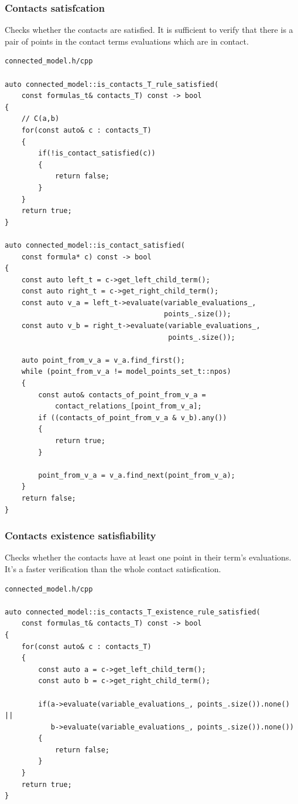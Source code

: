 \documentclass{article}
\begin{document}
	\subsubsection*{Contacts satisfcation}
	Checks whether the contacts are satisfied. It is sufficient to verify that there is a pair of points in the contact terms evaluations which are in contact.
\\
\begin{lstlisting}
connected_model.h/cpp

auto connected_model::is_contacts_T_rule_satisfied(
	const formulas_t& contacts_T) const -> bool
{
    // C(a,b)
    for(const auto& c : contacts_T)
    {
        if(!is_contact_satisfied(c))
        {
            return false;
        }
    }
    return true;
}

auto connected_model::is_contact_satisfied(
	const formula* c) const -> bool
{
    const auto left_t = c->get_left_child_term();
    const auto right_t = c->get_right_child_term();
    const auto v_a = left_t->evaluate(variable_evaluations_,
                                      points_.size());
    const auto v_b = right_t->evaluate(variable_evaluations_,
                                       points_.size());

    auto point_from_v_a = v_a.find_first();
    while (point_from_v_a != model_points_set_t::npos)
    {
        const auto& contacts_of_point_from_v_a =
            contact_relations_[point_from_v_a];
        if ((contacts_of_point_from_v_a & v_b).any())
        {
            return true;
        }

        point_from_v_a = v_a.find_next(point_from_v_a);
    }
    return false;
}
\end{lstlisting}

	\newpage
	\subsubsection*{Contacts existence satisfiability}
	Checks whether the contacts have at least one point in their term's evaluations. It's a faster verification than the whole contact satisfication.
\\
\begin{lstlisting}
connected_model.h/cpp

auto connected_model::is_contacts_T_existence_rule_satisfied(
	const formulas_t& contacts_T) const -> bool
{
    for(const auto& c : contacts_T)
    {
        const auto a = c->get_left_child_term();
        const auto b = c->get_right_child_term();

        if(a->evaluate(variable_evaluations_, points_.size()).none() ||
           b->evaluate(variable_evaluations_, points_.size()).none())
        {
            return false;
        }
    }
    return true;
}
\end{lstlisting}
\end{document}
